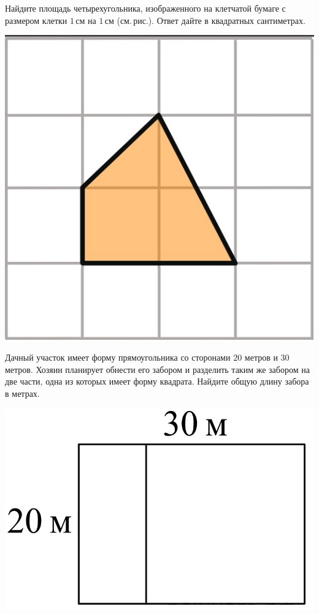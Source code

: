 \begin{homework}[number=3]
\begin{listofex}
		\item
		\begin{minipage}[t]{0.68\linewidth}
			Найдите площадь четырехугольника, изображенного на клетчатой бумаге с размером клетки \(1\) см на \(1\) см (см. рис.). Ответ дайте в квадратных сантиметрах.
		\end{minipage}
		\hspace{0.02\linewidth}
		\begin{minipage}[t]{0.27\linewidth}
			\includegraphics[align=t, width=\linewidth]{../pics/G101M8H3-9}
		\end{minipage}
		\item
		\begin{minipage}[t]{0.68\linewidth}
			Дачный участок имеет форму прямоугольника со сторонами \(20\) метров и \(30\) метров. Хозяин планирует обнести его забором и разделить таким же забором на две части, одна из которых имеет форму квадрата. Найдите общую длину забора в метрах.
		\end{minipage}
		\hspace{0.02\linewidth}
		\begin{minipage}[t]{0.27\linewidth}
			\includegraphics[align=t, width=\linewidth]{../pics/G101M8H3-10}

\end{minipage}
\end{listofex}
\end{homework}
